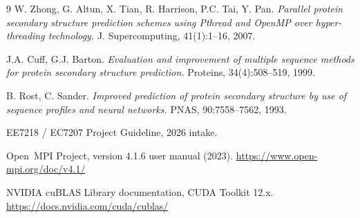 \documentclass[11pt,a4paper]{article}
\begin{document}
\begin{thebibliography}{9}
 W. Zhong, G. Altun, X. Tian, R. Harrison, P.C. Tai,
Y. Pan. \emph{Parallel protein secondary structure prediction schemes
using Pthread and OpenMP over hyper-threading technology.}
J. Supercomputing, 41(1):1--16, 2007.

 J.A. Cuff, G.J. Barton. \emph{Evaluation and
improvement of multiple sequence methods for protein secondary structure
prediction.} Proteins, 34(4):508--519, 1999.

 B. Rost, C. Sander. \emph{Improved prediction of
protein secondary structure by use of sequence profiles and neural
networks.} PNAS, 90:7558--7562, 1993.

 EE7218 / EC7207 Project Guideline, 2026 intake.

 Open~MPI Project, version 4.1.6 user manual (2023).
\url{https://www.open-mpi.org/doc/v4.1/}

 NVIDIA cuBLAS Library documentation, CUDA Toolkit 12.x.
\url{https://docs.nvidia.com/cuda/cublas/}
\end{thebibliography}
\end{document}
